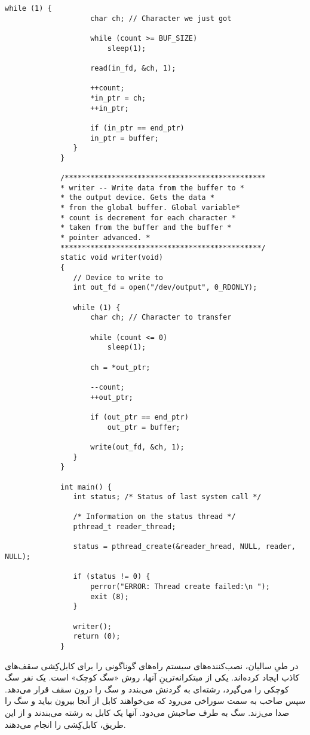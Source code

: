 \begin{LTR}
\begin{lstlisting}[style=C++Style]
             	while (1) {
             		char ch; // Character we just got

             		while (count >= BUF_SIZE)
             			sleep(1);

             		read(in_fd, &ch, 1);

             		++count;
             		*in_ptr = ch;
             		++in_ptr;

             		if (in_ptr == end_ptr)
             		in_ptr = buffer;
             	}
             }

             /***********************************************
             * writer -- Write data from the buffer to *
             * the output device. Gets the data *
             * from the global buffer. Global variable*
             * count is decrement for each character *
             * taken from the buffer and the buffer *
             * pointer advanced. *
             ***********************************************/
             static void writer(void)
             {
             	// Device to write to
             	int out_fd = open("/dev/output", 0_RDONLY);

             	while (1) {
             		char ch; // Character to transfer

             		while (count <= 0)
             			sleep(1);

             		ch = *out_ptr;

             		--count;
             		++out_ptr;

             		if (out_ptr == end_ptr)
             			out_ptr = buffer;

             		write(out_fd, &ch, 1);
             	}
             }

             int main() {
             	int status; /* Status of last system call */

             	/* Information on the status thread */
             	pthread_t reader_thread;

             	status = pthread_create(&reader_hread, NULL, reader, NULL);

             	if (status != 0) {
             		perror("ERROR: Thread create failed:\n ");
             		exit (8);
             	}

             	writer();
             	return (0);
             }
        \end{lstlisting}
\end{LTR}

\begin{tcolorbox}
    در طیِ سالیان، نصب‌کننده‌های سیستم راه‌های گوناگونی را برای کابل‌کِشی سقف‌های کاذب ایجاد کرده‌اند. یکی از مبتکرانه‌ترینِ آنها، روش «سگ کوچک» است. یک نفر سگ کوچکی را می‌گیرد، رشته‌ای به گردنش می‌بندد و سگ را درون سقف قرار می‌دهد. سپس صاحب به سمت سوراخی می‌رود که می‌خواهند کابل از آنجا بیرون بیاید و سگ را صدا می‌زند. سگ به طرف صاحبش می‌دود. آنها یک کابل به رشته می‌بندند و از این طریق، کابل‌کِشی را انجام می‌دهند.
\end{tcolorbox}